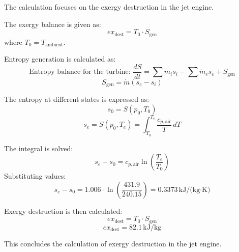 The calculation focuses on the exergy destruction in the jet engine.  

The exergy balance is given as:  
\[
ex_{\text{dest}} = T_0 \cdot S_{\text{gen}}
\]  
where \( T_0 = T_{\text{ambient}} \).  

Entropy generation is calculated as:  
\[
\text{Entropy balance for the turbine: }  
\frac{dS}{dt} = \sum \dot{m}_i s_i - \sum \dot{m}_e s_e + S_{\text{gen}}
\]  
\[
S_{\text{gen}} = \dot{m} (s_e - s_i)
\]  

The entropy at different states is expressed as:  
\[
s_0 = S(p_0, T_0)  
\]  
\[
s_e = S(p_0, T_e) = \int_{T_0}^{T_e} \frac{c_{p,\text{air}}}{T} \, dT  
\]  

The integral is solved:  
\[
s_e - s_0 = c_{p,\text{air}} \ln \left( \frac{T_e}{T_0} \right)  
\]  
Substituting values:  
\[
s_e - s_0 = 1.006 \cdot \ln \left( \frac{431.9}{240.15} \right) = 0.3373 \, \text{kJ/(kg·K)}  
\]  

Exergy destruction is then calculated:  
\[
ex_{\text{dest}} = T_0 \cdot S_{\text{gen}}  
\]  
\[
ex_{\text{dest}} = 82.1 \, \text{kJ/kg}  
\]  

This concludes the calculation of exergy destruction in the jet engine.